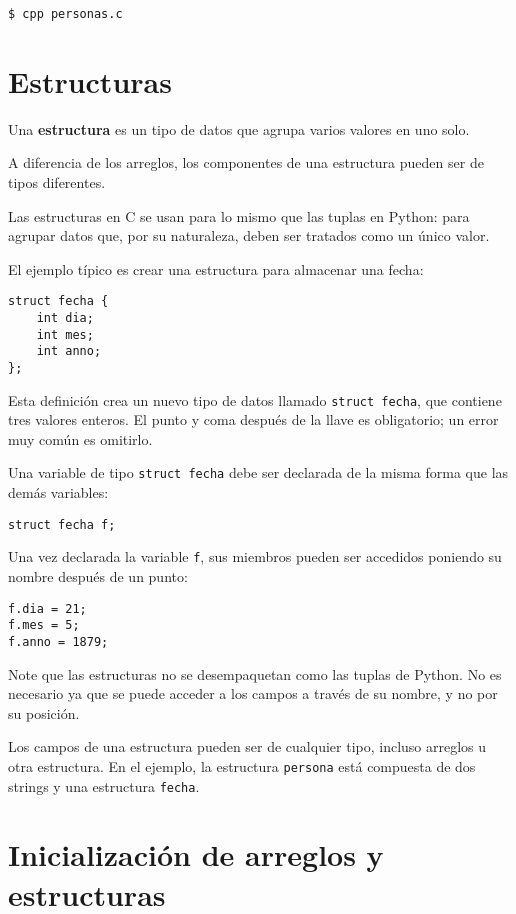 \begin{lstlisting}
$ cpp personas.c
\end{lstlisting}

\section{Estructuras}

Una \textbf{estructura} es un tipo de datos que agrupa varios valores en
uno solo.

A diferencia de los arreglos, los componentes de una estructura pueden
ser de tipos diferentes.

Las estructuras en C se usan para lo mismo que las tuplas en Python:
para agrupar datos que, por su naturaleza, deben ser tratados como un
único valor.

El ejemplo típico es crear una estructura para almacenar una fecha:

\begin{lstlisting}
struct fecha {
    int dia;
    int mes;
    int anno;
};
\end{lstlisting}

Esta definición crea un nuevo tipo de datos llamado
\lstinline!struct fecha!, que contiene tres valores enteros. El punto y
coma después de la llave es obligatorio; un error muy común es omitirlo.

Una variable de tipo \lstinline!struct fecha! debe ser declarada de la
misma forma que las demás variables:

\begin{lstlisting}
struct fecha f;
\end{lstlisting}

Una vez declarada la variable \lstinline!f!, sus miembros pueden ser
accedidos poniendo su nombre después de un punto:

\begin{lstlisting}
f.dia = 21;
f.mes = 5;
f.anno = 1879;
\end{lstlisting}

Note que las estructuras no se desempaquetan como las tuplas de Python.
No es necesario ya que se puede acceder a los campos a través de su
nombre, y no por su posición.

Los campos de una estructura pueden ser de cualquier tipo, incluso
arreglos u otra estructura. En el ejemplo, la estructura
\lstinline!persona! está compuesta de dos strings y una estructura
\lstinline!fecha!.

\section{Inicialización de arreglos y estructuras}

